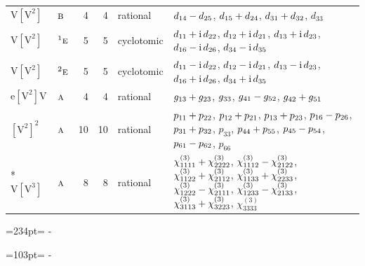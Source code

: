 \documentclass[10pt,a4paper]{article}
\newcommand{\needspace}[1]{\par\penalty-100\begingroup\dimen0=#1\relax\dimen2=\pagegoal
  \advance\dimen2-\pagetotal\ifdim\dimen0>\dimen2\relax\ifdim\dimen2>0pt\vfil\break\fi\fi
  \endgroup}
\numberwithin{equation}{section}
\newcommand{\irr}[1]{\text{\normalfont\scshape #1}}
\newcommand{\conjpair}[1]{{}^{#1}}
\newcommand{\iunit}{\mathrm{i}}
\newcommand{\jahn}[1]{\mathrm{#1}}
\newlength{\fillwidth}\newlength{\cellwidth}\newlength{\colwidth}
\newcommand{\signbreak}{\penalty100\relax}
\begin{document}
{\begin{longtable}{@{}llrrl>{\RaggedRight\arraybackslash}p{\fillwidth}@{}}
$\jahn{V[V^{2}]}$ & $\irr{b}$ & 4 & 4 & rational & $d_{14} -\signbreak d_{25}$, $d_{15} +\signbreak d_{24}$, $d_{31} +\signbreak d_{32}$, $d_{33}$\\
$\jahn{V[V^{2}]}$ & $\conjpair{1}\irr{e}$ & 5 & 5 & cyclotomic & $d_{11} +\signbreak \iunit{}\,d_{22}$, $d_{12} +\signbreak \iunit{}\,d_{21}$, $d_{13} +\signbreak \iunit{}\,d_{23}$, $d_{16} -\signbreak \iunit{}\,d_{26}$, $d_{34} -\signbreak \iunit{}\,d_{35}$\\
$\jahn{V[V^{2}]}$ & $\conjpair{2}\irr{e}$ & 5 & 5 & cyclotomic & $d_{11} -\signbreak \iunit{}\,d_{22}$, $d_{12} -\signbreak \iunit{}\,d_{21}$, $d_{13} -\signbreak \iunit{}\,d_{23}$, $d_{16} +\signbreak \iunit{}\,d_{26}$, $d_{34} +\signbreak \iunit{}\,d_{35}$\\
$\jahn{e[V^{2}]V}$ & $\irr{a}$ & 4 & 4 & rational & $\mathnormal{g}_{13} +\signbreak \mathnormal{g}_{23}$, $\mathnormal{g}_{33}$, $\mathnormal{g}_{41} -\signbreak \mathnormal{g}_{52}$, $\mathnormal{g}_{42} +\signbreak \mathnormal{g}_{51}$\\
$\jahn{[V^{2}]^{2}}$ & $\irr{a}$ & 10 & 10 & rational & $p_{11} +\signbreak p_{22}$, $p_{12} +\signbreak p_{21}$, $p_{13} +\signbreak p_{23}$, $p_{16} -\signbreak p_{26}$, $p_{31} +\signbreak p_{32}$, $p_{33}$, $p_{44} +\signbreak p_{55}$, $p_{45} -\signbreak p_{54}$, $p_{61} -\signbreak p_{62}$, $p_{66}$\\*
$\jahn{V[V^{3}]}$ & $\irr{a}$ & 8 & 8 & rational & $\chi^{(3)}_{1111} +\signbreak \chi^{(3)}_{2222}$, $\chi^{(3)}_{1112} -\signbreak \chi^{(3)}_{2122}$, $\chi^{(3)}_{1122} +\signbreak \chi^{(3)}_{2112}$, $\chi^{(3)}_{1133} +\signbreak \chi^{(3)}_{2233}$, $\chi^{(3)}_{1222} -\signbreak \chi^{(3)}_{2111}$, $\chi^{(3)}_{1233} -\signbreak \chi^{(3)}_{2133}$, $\chi^{(3)}_{3113} +\signbreak \chi^{(3)}_{3223}$, $\chi^{(3)}_{3333}$\\
\bottomrule\end{longtable}}
\needspace{234pt}
\needspace{103pt}
\end{document}
